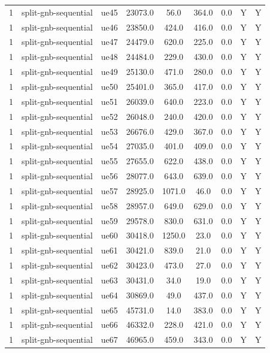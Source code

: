 \begin{table}[ht]
\begin{tabular}{|c|c|c|c|c|c|c|c|c|}
1 & split-gnb-sequential & ue45 & 23073.0 & 56.0 & 364.0 & 0.0 & Y & Y \\
1 & split-gnb-sequential & ue46 & 23850.0 & 424.0 & 416.0 & 0.0 & Y & Y \\
1 & split-gnb-sequential & ue47 & 24479.0 & 620.0 & 225.0 & 0.0 & Y & Y \\
1 & split-gnb-sequential & ue48 & 24484.0 & 229.0 & 430.0 & 0.0 & Y & Y \\
1 & split-gnb-sequential & ue49 & 25130.0 & 471.0 & 280.0 & 0.0 & Y & Y \\
1 & split-gnb-sequential & ue50 & 25401.0 & 365.0 & 417.0 & 0.0 & Y & Y \\
1 & split-gnb-sequential & ue51 & 26039.0 & 640.0 & 223.0 & 0.0 & Y & Y \\
1 & split-gnb-sequential & ue52 & 26048.0 & 240.0 & 420.0 & 0.0 & Y & Y \\
1 & split-gnb-sequential & ue53 & 26676.0 & 429.0 & 367.0 & 0.0 & Y & Y \\
1 & split-gnb-sequential & ue54 & 27035.0 & 401.0 & 409.0 & 0.0 & Y & Y \\
1 & split-gnb-sequential & ue55 & 27655.0 & 622.0 & 438.0 & 0.0 & Y & Y \\
1 & split-gnb-sequential & ue56 & 28077.0 & 643.0 & 639.0 & 0.0 & Y & Y \\
1 & split-gnb-sequential & ue57 & 28925.0 & 1071.0 & 46.0 & 0.0 & Y & Y \\
1 & split-gnb-sequential & ue58 & 28957.0 & 649.0 & 629.0 & 0.0 & Y & Y \\
1 & split-gnb-sequential & ue59 & 29578.0 & 830.0 & 631.0 & 0.0 & Y & Y \\
1 & split-gnb-sequential & ue60 & 30418.0 & 1250.0 & 23.0 & 0.0 & Y & Y \\
1 & split-gnb-sequential & ue61 & 30421.0 & 839.0 & 21.0 & 0.0 & Y & Y \\
1 & split-gnb-sequential & ue62 & 30423.0 & 473.0 & 27.0 & 0.0 & Y & Y \\
1 & split-gnb-sequential & ue63 & 30431.0 & 34.0 & 19.0 & 0.0 & Y & Y \\
1 & split-gnb-sequential & ue64 & 30869.0 & 49.0 & 437.0 & 0.0 & Y & Y \\
1 & split-gnb-sequential & ue65 & 45731.0 & 14.0 & 383.0 & 0.0 & Y & Y \\
1 & split-gnb-sequential & ue66 & 46332.0 & 228.0 & 421.0 & 0.0 & Y & Y \\
1 & split-gnb-sequential & ue67 & 46965.0 & 459.0 & 343.0 & 0.0 & Y & Y \\

\end{tabular}
\end{table}
